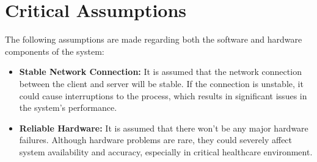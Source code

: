 \documentclass{article}
\begin{document}
\section{Critical Assumptions}

The following assumptions are made regarding both the software and hardware components of the system:

\begin{itemize}
    \item \textbf{Stable Network Connection:} It is assumed that the network connection between the client and server will be stable. If the connection is unstable, it could cause interruptions to the process, which results in significant issues in the system’s performance.
        
    \item \textbf{Reliable Hardware:} It is assumed that there won’t be any major hardware failures. Although hardware problems are rare, they could severely affect system availability and accuracy, especially in critical healthcare environment.
\end{itemize}
\end{document}
